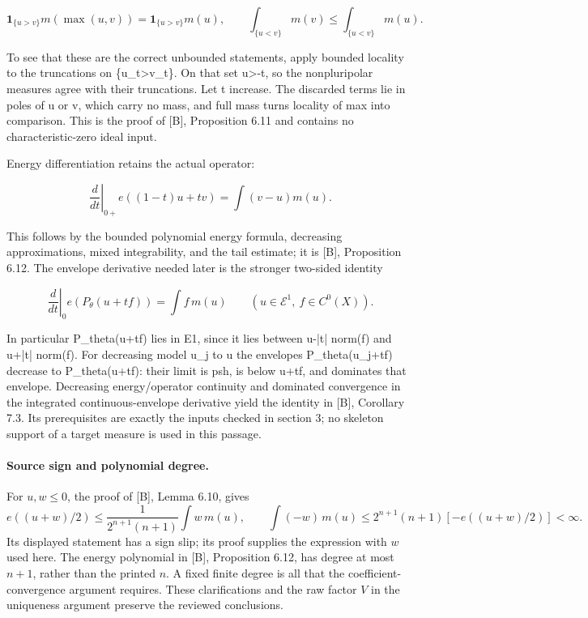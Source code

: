 \documentclass[11pt]{article}
\begin{document}
\[
\mathbf1_{\{u>v\}}m(\max(u,v))=\mathbf1_{\{u>v\}}m(u),\qquad
\int_{\{u<v\}}m(v)\leq\int_{\{u<v\}}m(u).
\]

To see that these are the correct unbounded statements, apply bounded locality to the truncations on \{u\_t\textgreater{}v\_t\}. On that set u\textgreater{}-t, so the nonpluripolar measures agree with their truncations. Let t increase. The discarded terms lie in poles of u or v, which carry no mass, and full mass turns locality of max into comparison. This is the proof of [B], Proposition 6.11 and contains no characteristic-zero ideal input.

Energy differentiation retains the actual operator:

\[
\left.\frac{d}{dt}\right|_{0+} e((1-t)u+tv)=\int(v-u)m(u).
\]

This follows by the bounded polynomial energy formula, decreasing approximations, mixed integrability, and the tail estimate; it is [B], Proposition 6.12. The envelope derivative needed later is the stronger two-sided identity

\[
\left.\frac{d}{dt}\right|_0 e(P_\theta(u+tf))=\int f\,m(u)
\qquad(u\in\mathcal E^1,\ f\in C^0(X)).
\]

In particular P\_theta(u+tf) lies in E1, since it lies between u-|t| norm(f) and u+|t| norm(f). For decreasing model u\_j to u the envelopes P\_theta(u\_j+tf) decrease to P\_theta(u+tf): their limit is psh, is below u+tf, and dominates that envelope. Decreasing energy/operator continuity and dominated convergence in the integrated continuous-envelope derivative yield the identity in [B], Corollary 7.3. Its prerequisites are exactly the inputs checked in section 3; no skeleton support of a target measure is used in this passage.

\paragraph{Source sign and polynomial degree.}
For $u,w\leq0$, the proof of [B], Lemma 6.10, gives
\[
e((u+w)/2)\leq\frac{1}{2^{n+1}(n+1)}\int w\,m(u),
\qquad
\int(-w)\,m(u)\leq2^{n+1}(n+1)[-e((u+w)/2)]<\infty.
\]
Its displayed statement has a sign slip; its proof supplies the expression with
$w$ used here. The energy polynomial in [B], Proposition 6.12, has degree at
most $n+1$, rather than the printed $n$. A fixed finite degree is all that the
coefficient-convergence argument requires. These clarifications and the raw
factor $V$ in the uniqueness argument preserve the reviewed conclusions.
\end{document}
